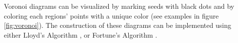 \vspace{-0.5cm} %

Voronoi diagrams can be visualized by marking seeds with black dots and by coloring each regions' points with a unique color (see examples in figure \ref{fig:voronoi}).
The construction of these diagrams can be implemented using either Lloyd's Algorithm \cite{voronoi_lloyd}, or Fortune's Algorithm \cite{voronoi_fortune}. 